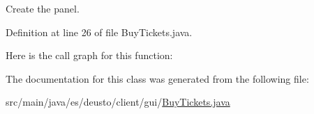 Create the panel. 

Definition at line 26 of file Buy\+Tickets.\+java.

Here is the call graph for this function\+:


The documentation for this class was generated from the following file\+:\begin{DoxyCompactItemize}
\item 
src/main/java/es/deusto/client/gui/\mbox{\hyperlink{_buy_tickets_8java}{Buy\+Tickets.\+java}}\end{DoxyCompactItemize}
